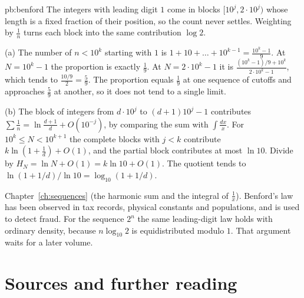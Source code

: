 \begin{solution}{pb:benford}
\idea The integers with leading digit $1$ come in blocks $[10^j,2\cdot10^j)$ whose length is a fixed fraction of their position,
so the count never settles. Weighting by $\frac1n$ turns each block into the same contribution $\log2$.

\writeup (a) The number of $n<10^k$ starting with $1$ is $1+10+\dots+10^{k-1}=\frac{10^k-1}9$. At $N=10^k-1$ the proportion is exactly
$\frac19$. At $N=2\cdot10^k-1$ it is $\frac{(10^k-1)/9+10^k}{2\cdot10^k-1}$, which tends to $\frac{10/9}{2}=\frac59$. The proportion equals $\frac19$ at one sequence of cutoffs and approaches $\frac59$ at another, so it does not tend to a single limit.

(b) The block of integers from $d\cdot10^j$ to $(d+1)10^j-1$ contributes $\sum\frac1n=\ln\frac{d+1}d+O(10^{-j})$, by comparing the sum with $\int\frac{dx}x$. For $10^k\le N<10^{k+1}$ the complete blocks with $j<k$ contribute $k\ln(1+\frac1d)+O(1)$, and the partial block contributes at most $\ln 10$. Divide by $H_N=\ln N+O(1)=k\ln 10+O(1)$. The quotient tends to $\ln(1+1/d)/\ln 10=\log_{10}(1+1/d)$.

\tools Chapter~\ref{ch:sequences} (the harmonic sum and the integral of $\frac1x$).
\leads Benford's law has been observed in tax records, physical constants and populations, and is used to detect fraud. For the sequence $2^n$ the same leading-digit law holds with ordinary density, because $n\log_{10}2$ is equidistributed modulo $1$. That argument waits for a later volume.
\end{solution}

\section*{Sources and further reading}

